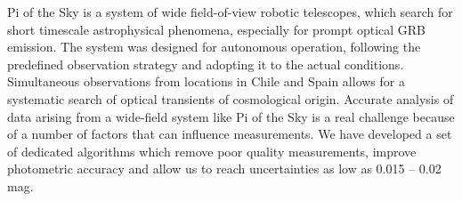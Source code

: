 


\bigskip



\bigskip

\noindent Pi of the Sky is a system of  wide field-of-view  robotic telescopes, which search for short timescale astrophysical phenomena, especially for prompt optical GRB emission. The system was designed for autonomous operation, following the predefined observation strategy and adopting it to the actual conditions. Simultaneous observations from locations in Chile and Spain allows for a systematic search of optical transients of cosmological origin.
Accurate analysis of data arising from a wide-field system like Pi of the Sky  is a real challenge because of a number of factors that can influence measurements. We have developed a set of dedicated algorithms which remove poor quality measurements, improve photometric accuracy and allow us to reach uncertainties  as low as 0.015 – 0.02 mag.
